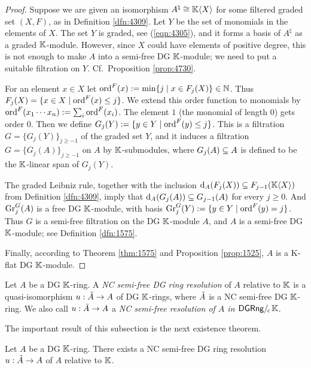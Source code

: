 \begin{proof}
Suppose we are given an isomorphism 
$A^{\natural} \cong \mathbb{K} \langle X \rangle$
for some filtered graded set $(X, F)$, as in Definition \ref{dfn:4309}.
Let $Y$ be the set of monomials in the elements of $X$. The set $Y$ is 
graded, see (\ref{eqn:4305}), and it forms a basis of $A^{\natural}$ as a 
graded $\mathbb{K}$-module. However, since $X$ could have elements of positive degree, 
this is not enough to make $A$ into a semi-free DG $\mathbb{K}$-module; we need to put 
a suitable filtration on $Y$. Cf.\ Proposition \ref{prop:4730}.

For an element $x \in X$ let 
$\operatorname{ord}^F(x) := \operatorname{min} \{ j \mid x \in F_j(X) \} \in \mathbb{N}$.
Thus 
$F_j(X) = \{ x \in X \mid \operatorname{ord}^F(x) \leq j \}$.
We extend this order function to monomials by 
$\operatorname{ord}^F(x_{1} \cdots x_{n}) := \sum_{i} \operatorname{ord}^F(x_{i})$.
The element $1$ (the monomial of length $0$) gets order $0$. 
Then we define 
$G_j(Y) := \{ y \in Y \mid \operatorname{ord}^F(y) \leq j \}$.
This is a filtration 
$G = \{ G_{j}(Y) \}_{j \geq -1}$ of the graded set $Y$, and it induces a 
filtration $G = \{ G_{j}(A) \}_{j \geq -1}$ on $A$ 
by $\mathbb{K}$-submodules, where $G_{j}(A) \subseteq A$ is defined to be the $\mathbb{K}$-linear 
span of $G_{j}(Y)$. 

The graded Leibniz rule, together with the inclusion 
$\d_A (F_j(X)) \sub \lb F_{j - 1}(\K \bra{X})$
from Definition \ref{dfn:4309}, imply that 
$\mathrm{d}_A (G_{j}(A)) \subseteq G_{j - 1}(A)$
for every $j \geq 0$. And 
$\operatorname{Gr}^G_j(A)$ is a free DG $\mathbb{K}$-module, with basis 
$\operatorname{Gr}_j^G(Y) := \{ y \in Y \mid \operatorname{ord}^F(y) = j \}$.
Thus $G$ is a semi-free filtration on the DG $\mathbb{K}$-module $A$, and $A$ is a 
semi-free DG $\mathbb{K}$-module; see Definition \ref{dfn:1575}.

Finally, according to Theorem \ref{thm:1575} and Proposition \ref{prop:1525}, 
$A$ is a K-flat DG $\mathbb{K}$-module. 
\end{proof}

\begin{dfn} \label{dfn:4310}
Let $A$ be a DG $\mathbb{K}$-ring. A {\em NC semi-free DG ring resolution} of 
$A$ relative to $\mathbb{K}$ is a quasi-isomorphism $u : \tilde{A} \to A$ 
of DG $\mathbb{K}$-rings, where $\tilde{A}$ is a NC semi-free DG $\mathbb{K}$-ring.
We also call $u : \tilde{A} \to A$ a {\em NC semi-free resolution of $A$ in 
$\mathrm{\mathsf{DGRng}} /_{\mspace{-2mu} \mathrm{c}} \mspace{2mu} \mathbb{K}$}. 
\end{dfn}

The important result of this subsection is the next existence theorem. 

\begin{thm} \label{thm:4310}
Let $A$ be a DG $\mathbb{K}$-ring. There exists a NC semi-free DG ring
resolution $u : \tilde{A} \to A$ of $A$ relative to $\mathbb{K}$. 
\end{thm}

